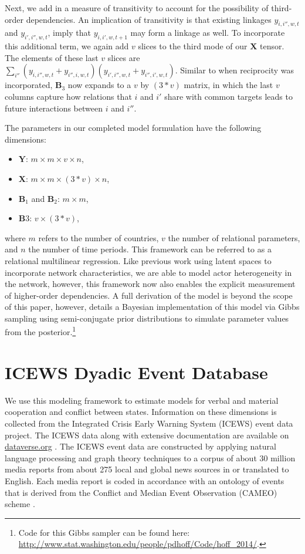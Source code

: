 \documentclass[3p,times,twocolumn,authoryear,12pt]{elsarticle}
\newcommand{\bl}[1]{{\mathbf #1}}
\begin{document}
Next, we add in a measure of transitivity to account for the possibility of third-order dependencies. An implication of transitivity is that existing linkages $y_{i,i'',w,t}$ and $y_{i',i'',w,t}$, imply that $y_{i,i',w,t+1}$ may form a linkage as well. To incorporate this additional term, we again add $v$ slices to the third mode of our $\bl X$ tensor. The elements of these last $v$ slices are  $\sum_{i''} ( y_{i,i'',w,t} + y_{i'',i,w,t}) ( y_{i',i'',w,t} + y_{i'',i',w,t})$. Similar to when reciprocity was incorporated, $\bl B_3$ now expands to a $v$ by $(3*v)$ matrix, in which the last $v$ columns capture how relations that $i$ and $i'$ share with common targets leads to future interactions between $i$ and $i''$.

The parameters in our completed model formulation have the following dimensions: 

\begin{itemize}
	\item $\bl Y$: $m \times m \times v \times n$, 
	\item $\bl X$: $m \times m \times (3*v) \times n$, 	
	\item $\bl B_{1}$ and $\bl B_{2}$: $m \times m$, 	
	\item $\bl B3$: $v \times (3*v)$,
\end{itemize}

\noindent where $m$ refers to the number of countries, $v$ the number of relational parameters, and $n$ the number of time periods. This framework can be referred to as a relational multilinear regression. Like previous work using latent spaces to incorporate network characteristics, we are able to model actor heterogeneity in the network, however, this framework now also enables the explicit measurement of higher-order dependencies. A full derivation of the model is beyond the scope of this paper, however, \citet{hoff:2015} details a Bayesian implementation of this model via Gibbs sampling using semi-conjugate prior distributions to simulate parameter values from the posterior.\footnote{Code for this Gibbs sampler can be found here: \url{http://www.stat.washington.edu/people/pdhoff/Code/hoff_2014/}.}

\section{ICEWS Dyadic Event Database}

We use this modeling framework to estimate models for verbal and material cooperation and conflict between states. Information on these dimensions is collected from the Integrated Crisis Early Warning System (ICEWS) event data project. The ICEWS data along with extensive documentation are available on \url{dataverse.org} \citep{icews:2015:aggregations,icews:2015:data}. The ICEWS event data are constructed by applying natural language processing and graph theory techniques \citep{boschee:natarajan:etal:2013} to a corpus of about 30 million media reports from about 275 local and global news sources in or translated to English.  Each media report is coded in accordance with an ontology of events that is derived from the Conflict and Median Event Observation (CAMEO) scheme \citep{schrodt:etal:2009}. 
\end{document}
